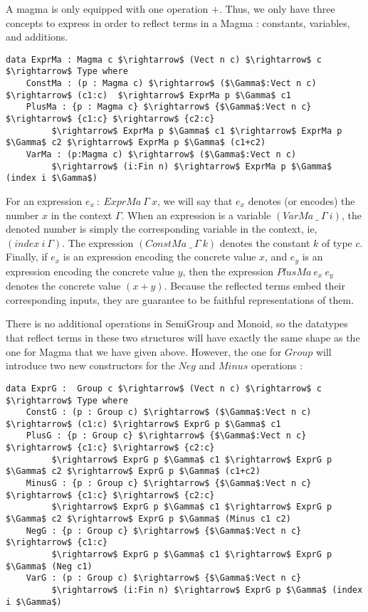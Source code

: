 A magma is only equipped with one operation $+$. Thus, we only have three concepts to express in order to reflect terms in a Magma : constants, variables, and additions.

\begin{lstlisting}
data ExprMa : Magma c $\rightarrow$ (Vect n c) $\rightarrow$ c $\rightarrow$ Type where
    ConstMa : (p : Magma c) $\rightarrow$ ($\Gamma$:Vect n c) $\rightarrow$ (c1:c)  $\rightarrow$ ExprMa p $\Gamma$ c1 
    PlusMa : {p : Magma c} $\rightarrow$ {$\Gamma$:Vect n c} $\rightarrow$ {c1:c} $\rightarrow$ {c2:c} 
         $\rightarrow$ ExprMa p $\Gamma$ c1 $\rightarrow$ ExprMa p $\Gamma$ c2 $\rightarrow$ ExprMa p $\Gamma$ (c1+c2) 
    VarMa : (p:Magma c) $\rightarrow$ ($\Gamma$:Vect n c)
         $\rightarrow$ (i:Fin n) $\rightarrow$ ExprMa p $\Gamma$ (index i $\Gamma$)
\end{lstlisting}


For an expression $e_x\ :\ ExprMa\ \Gamma\ x$, we will say that $e_x$ denotes (or encodes) the number $x$ in the context $\Gamma$.
When an expression is a variable $(VarMa\ \_\ \Gamma\ i)$, the denoted number is simply the corresponding variable in the context, ie, $(index\ i\ \Gamma)$.
The expression $(ConstMa\ \_\ \Gamma\ k)$ denotes the constant $k$ of type $c$. Finally, if $e_x$ is an expression encoding the concrete value $x$, and $e_y$ is an expression encoding the concrete value $y$, then the expression $PlusMa\ e_x\ e_y$ denotes the concrete value $(x + y)$. Because the reflected terms embed their corresponding inputs, they are guarantee to be faithful representations of them.

There is no additional operations in SemiGroup and Monoid, so the datatypes that reflect terms in these two structures will have exactly the same shape as the one for Magma that we have given above.
However, the one for $Group$ will introduce two new constructors for the $Neg$ and $Minus$ operations :

\begin{lstlisting}
data ExprG :  Group c $\rightarrow$ (Vect n c) $\rightarrow$ c $\rightarrow$ Type where
    ConstG : (p : Group c) $\rightarrow$ ($\Gamma$:Vect n c) $\rightarrow$ (c1:c) $\rightarrow$ ExprG p $\Gamma$ c1
    PlusG : {p : Group c} $\rightarrow$ {$\Gamma$:Vect n c} $\rightarrow$ {c1:c} $\rightarrow$ {c2:c} 
         $\rightarrow$ ExprG p $\Gamma$ c1 $\rightarrow$ ExprG p $\Gamma$ c2 $\rightarrow$ ExprG p $\Gamma$ (c1+c2)
    MinusG : {p : Group c} $\rightarrow$ {$\Gamma$:Vect n c} $\rightarrow$ {c1:c} $\rightarrow$ {c2:c} 
         $\rightarrow$ ExprG p $\Gamma$ c1 $\rightarrow$ ExprG p $\Gamma$ c2 $\rightarrow$ ExprG p $\Gamma$ (Minus c1 c2)
    NegG : {p : Group c} $\rightarrow$ {$\Gamma$:Vect n c} $\rightarrow$ {c1:c} 
         $\rightarrow$ ExprG p $\Gamma$ c1 $\rightarrow$ ExprG p $\Gamma$ (Neg c1)
    VarG : (p : Group c) $\rightarrow$ {$\Gamma$:Vect n c} 
         $\rightarrow$ (i:Fin n) $\rightarrow$ ExprG p $\Gamma$ (index i $\Gamma$)
\end{lstlisting}


